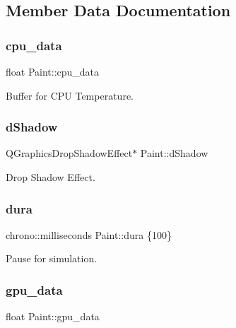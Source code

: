 \subsection{Member Data Documentation}
\mbox{\label{classPaint_a289c2a24e5186491ddd37a620eaac8b2}} 
\subsubsection{\texorpdfstring{cpu\_data}{cpu\_data}}
{\footnotesize\ttfamily float Paint\+::cpu\+\_\+data\hspace{0.3cm}{\ttfamily [private]}}



Buffer for C\+PU Temperature. 

\mbox{\label{classPaint_adc5781ac10ec78958b8818b46a096914}} 
\subsubsection{\texorpdfstring{dShadow}{dShadow}}
{\footnotesize\ttfamily Q\+Graphics\+Drop\+Shadow\+Effect$\ast$ Paint\+::d\+Shadow\hspace{0.3cm}{\ttfamily [private]}}



Drop Shadow Effect. 

\mbox{\label{classPaint_a596f261f63bbc34d4ec35639eeb148ce}} 
\subsubsection{\texorpdfstring{dura}{dura}}
{\footnotesize\ttfamily chrono\+::milliseconds Paint\+::dura \{100\}\hspace{0.3cm}{\ttfamily [private]}}



Pause for simulation. 

\mbox{\label{classPaint_a561a7ed14d82369f8a88ba76b0bcbb7e}} 
\subsubsection{\texorpdfstring{gpu\_data}{gpu\_data}}
{\footnotesize\ttfamily float Paint\+::gpu\+\_\+data\hspace{0.3cm}{\ttfamily [private]}}



